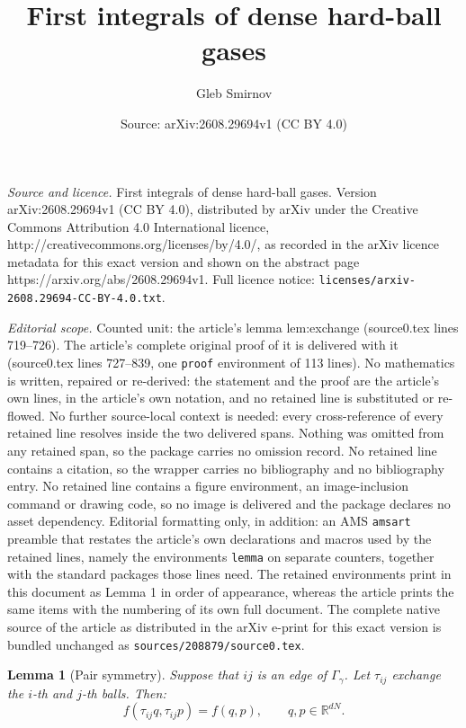 \documentclass[10pt,a4paper]{amsart}
\title{First integrals of dense hard-ball gases}
\author{Gleb Smirnov}
\date{Source: arXiv:2608.29694v1 (CC BY 4.0)}
\newtheorem{lemma}{Lemma}
\def \R {\mathbb{R}}
\begin{document}
\maketitle

\noindent\emph{Source and licence.} First integrals of dense hard-ball gases. Version arXiv:2608.29694v1 (CC BY 4.0), distributed by arXiv under the Creative Commons Attribution 4.0 International licence, http://creativecommons.org/licenses/by/4.0/, as recorded in the arXiv licence metadata for this exact version and shown on the abstract page https://arxiv.org/abs/2608.29694v1. Full licence notice: \texttt{licenses/arxiv-2608.29694-CC-BY-4.0.txt}.\par\smallskip

\noindent\textit{Editorial scope.} Counted unit: the article's lemma lem:exchange (source0.tex lines 719--726). The article's complete original proof of it is delivered with it (source0.tex lines 727--839, one \texttt{proof} environment of 113 lines). No mathematics is written, repaired or re-derived: the statement and the proof are the article's own lines, in the article's own notation, and no retained line is substituted or re-flowed.  No further source-local context is needed: every cross-reference of every retained line resolves inside the two delivered spans.  Nothing was omitted from any retained span, so the package carries no omission record.  No retained line contains a citation, so the wrapper carries no bibliography and no bibliography entry.  No retained line contains a figure environment, an image-inclusion command or drawing code, so no image is delivered and the package declares no asset dependency.  Editorial formatting only, in addition: an AMS \texttt{amsart} preamble that restates the article's own declarations and macros used by the retained lines, namely the environments \texttt{lemma} on separate counters, together with the standard packages those lines need.  The retained environments print in this document as Lemma 1 in order of appearance, whereas the article prints the same items with the numbering of its own full document.  The complete native source of the article as distributed in the arXiv e-print for this exact version is bundled unchanged as \texttt{sources/208879/source0.tex}.
\begin{lemma}[Pair symmetry]\label{lem:exchange}
Suppose that \(ij\) is an edge of \(\Gamma_\gamma\). Let
\(\tau_{ij}\) exchange the \(i\)-th and \(j\)-th balls. Then:
\[
f(\tau_{ij}q,\tau_{ij}p)=f(q,p),
\qquad q,p\in\R^{dN}.
\]
\end{lemma}
\end{document}
